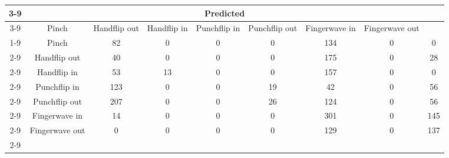 \documentclass{standalone}
\begin{document}
 
 \begin{tabular}{|c |c |c |c |c |c |c |c |c |}
\cline{3-9}\multicolumn{2}{c|}{} & \multicolumn{7}{c|}{Predicted} \\ 
\cline{3-9} \multicolumn{2}{c |}{ } & Pinch & Handflip out & Handflip in & Punchflip in & Punchflip out & Fingerwave in & Fingerwave out\\ 
\cline{1-9}\multirow{7}{*}{\rotatebox[origin=c]{90}{Actual}} & Pinch & 82 & 0 & 0 & 0 & 134 & 0 & 0\\ 
 \cline{2-9} & Handflip out & 40 & 0 & 0 & 0 & 175 & 0 & 28\\ 
 \cline{2-9} & Handflip in & 53 & 13 & 0 & 0 & 157 & 0 & 0\\ 
 \cline{2-9} & Punchflip in & 123 & 0 & 0 & 19 & 42 & 0 & 56\\ 
 \cline{2-9} & Punchflip out & 207 & 0 & 0 & 26 & 124 & 0 & 56\\ 
 \cline{2-9} & Fingerwave in & 14 & 0 & 0 & 0 & 301 & 0 & 145\\ 
 \cline{2-9} & Fingerwave out & 0 & 0 & 0 & 0 & 129 & 0 & 137\\ 
 \cline{2-9}\hline \end{tabular}
 
\end{document}
